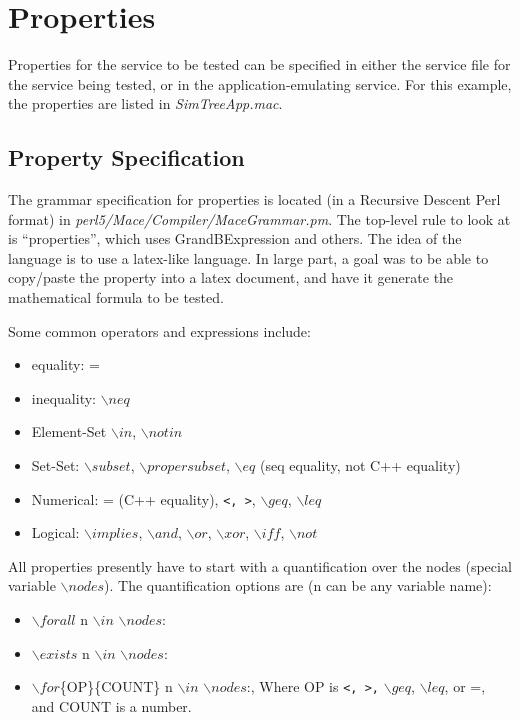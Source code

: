 \documentclass[12pt,letterpaper]{article}
\begin{document}
\section {Properties}
\label{Properties}
Properties for the service to be tested can be specified in either the service file for the service being tested, or in the application-emulating service.  For this example, the properties are listed in \emph{SimTreeApp.mac}.
\subsection {Property Specification}
\label {PropertySpecification}
The grammar specification for properties is located (in a Recursive Descent Perl format) in \emph{perl5/Mace/Compiler/MaceGrammar.pm}.  The top-level rule to look at is ``properties'', which uses GrandBExpression and others.  The idea of the language is to use a latex-like language.  In large part, a goal was to be able to copy/paste the property into a latex document, and have it generate the mathematical formula to be tested.

Some common operators and expressions include:
\begin{itemize}
\item equality: =
\item inequality: $\backslash neq$   
\item Element-Set $\backslash in$, $\backslash notin$
\item Set-Set: $\backslash subset$, $\backslash propersubset$, $\backslash eq$ (seq equality, not C++ equality)
\item Numerical: = (C++ equality), \texttt{<, >}, $\backslash geq$, $\backslash leq $
\item Logical: $\backslash implies$, $\backslash and$, $\backslash or$, $\backslash xor$, $\backslash iff$, $\backslash not$
\end{itemize}

All properties presently have to start with a quantification over the nodes (special variable $\backslash nodes$).  The quantification options are (n can be any variable name):
\begin{itemize}
\item $\backslash forall$ n $\backslash in$ $\backslash nodes$: 
\item $\backslash exists$ n $\backslash in$ $\backslash nodes$: 
\item $\backslash for$\{OP\}\{COUNT\} n $\backslash in$ $\backslash nodes$:, Where OP is \texttt{<, >,} $\backslash geq$, $\backslash leq$, or =, and COUNT is a number.
\end{itemize}
\end{document}

